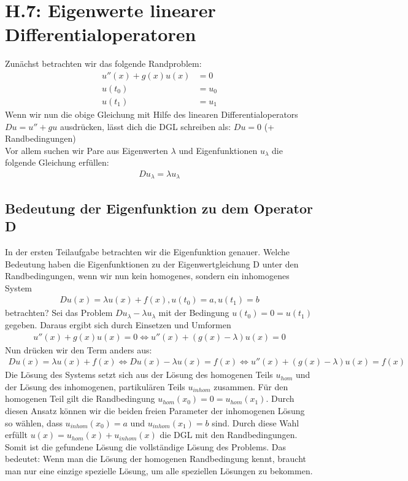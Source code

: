 \documentclass[ngerman]{scrartcl}
\begin{document}
\thispagestyle{fancy}

\section{H.7: Eigenwerte linearer Differentialoperatoren}
	Zunächst betrachten wir das folgende Randproblem:
	\begin{align*}
	u''(x) + g(x) u(x) &= 0\\
	u(t_0) &= u_0\\
	u(t_1) &= u_1
	\end{align*}
	Wenn wir nun die obige Gleichung mit Hilfe des linearen Differentialoperators $Du=u''+gu$ ausdrücken, lässt dich die DGL schreiben als: $Du=0$ (+ Randbedingungen) \\
	Vor allem suchen wir Pare aus Eigenwerten $\lambda$ und Eigenfunktionen $u_\lambda$ die folgende Gleichung erfüllen:
	\begin{align}
		Du_\lambda=\lambda u_\lambda
	\end{align}
\subsection{Bedeutung der Eigenfunktion zu dem Operator D}
In der ersten Teilaufgabe betrachten wir die Eigenfunktion genauer. Welche Bedeutung haben die Eigenfunktionen zu der Eigenwertgleichung D unter den Randbedingungen, wenn wir nun kein homogenes, sondern ein inhomogenes System 
\begin{align}
D u(x) = \lambda u(x) + f(x),  u (t_0) = a,  u(t_1) = b
\end{align} betrachten? \newline
Sei das Problem $D u_{\lambda} - \lambda u_{\lambda}$ mit der Bedingung $u(t_0) = 0 = u(t_1)$ gegeben. Daraus ergibt sich durch Einsetzen und Umformen 
\begin{align}
u''(x) + g(x) u(x) = 0 \Leftrightarrow u''(x) + (g(x)- \lambda) u(x) = 0
\end{align}
Nun drücken wir den Term anders aus:
\begin{align}
D u(x) = \lambda u(x) + f(x) \Leftrightarrow D u(x) - \lambda u(x) = f(x) \Leftrightarrow u''(x) + (g(x) - \lambda) u(x) = f(x)
\end{align}
Die Lösung des Systems setzt sich aus der Lösung des homogenen Teils $u_{hom}$ und der Lösung des inhomogenen, partikulären Teils $u_{inhom}$ zusammen.
Für den homogenen Teil gilt die Randbedingung $u_{hom}(x_0) = 0 = u_{hom}(x_1)$. Durch diesen Ansatz können wir die beiden freien Parameter der inhomogenen Lösung so wählen, dass $u_{inhom}(x_0) = a$ und $u_{inhom}(x_1) = b$ sind. Durch diese Wahl erfüllt $u(x) = u_{hom}(x) + u_{inhom}(x)$ die DGL mit den Randbedingungen. Somit ist die gefundene Lösung die vollständige Lösung des Problems.
Das bedeutet: Wenn man die Lösung der homogenen Randbedingung kennt, braucht man nur eine einzige spezielle Lösung, um alle speziellen Lösungen zu bekommen. \newline
\end{document}
